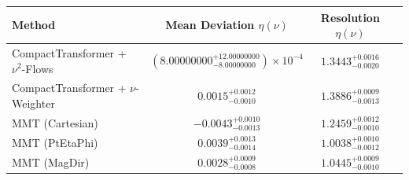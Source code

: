     \begin{tabular}{lccc}
        \toprule
        Method & Mean Deviation $\eta({\nu})$ & Resolution $\eta({\nu})$ \\
        \midrule
        CompactTransformer + $\nu^2$-Flows & $(8.00000000^{+12.00000000}_{-8.00000000})\times 10^{-4}$ & $1.3443^{+0.0016}_{-0.0020}$ \\
        CompactTransformer + $\nu$-Weighter & $0.0015^{+0.0012}_{-0.0010}$ & $1.3886^{+0.0009}_{-0.0013}$ \\
        MMT (Cartesian) & $-0.0043^{+0.0010}_{-0.0013}$ & $1.2459^{+0.0012}_{-0.0010}$ \\
        MMT (PtEtaPhi) & $0.0039^{+0.0013}_{-0.0014}$ & $1.0038^{+0.0010}_{-0.0012}$ \\
        MMT (MagDir) & $0.0028^{+0.0009}_{-0.0008}$ & $1.0445^{+0.0009}_{-0.0010}$ \\
        \bottomrule
    \end{tabular}